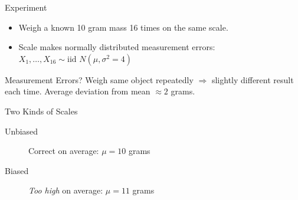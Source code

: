 \documentclass[handout]{beamer}
\date{Lecture 23}
\begin{document}
 





\begin{frame}[plain]
	\titlepage 
	

\end{frame} 

\begin{frame}
\begin{block}
	{Experiment}
	\begin{itemize}
		\item Weigh a known 10 gram mass 16 times on the same scale.
		\item Scale makes normally distributed measurement errors:
		$X_1, \hdots, X_{16} \sim \mbox{iid } N( \mu, \sigma^2 = 4)$
	\end{itemize}
\end{block}
\begin{alertblock}
			{Measurement Errors?}
		 Weigh same object repeatedly $\Rightarrow$ slightly different result each time. Average deviation from mean $\approx 2$ grams.
		\end{alertblock}
\begin{block}{Two Kinds of Scales}
	\begin{description}
			\item[Unbiased] Correct on average: $\mu = 10$ grams
			\item[Biased] \emph{Too high} on average: $\mu = 11$ grams
		\end{description}	
		
\end{block}

\end{frame}

\end{document}
